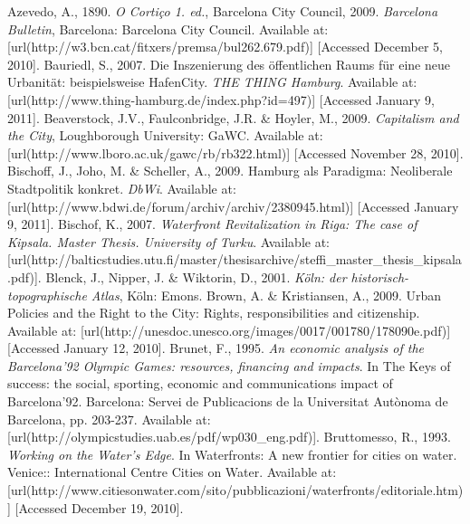 \myRefs%
{%
\startREF%
Azevedo, A., 1890. {\em O Cortiço 1. ed.}, \nl%
%
Barcelona City Council, 2009. {\em Barcelona Bulletin}, Barcelona: Barcelona City Council. Available at:  [url(http://w3.bcn.cat/fitxers/premsa/bul262.679.pdf)] [Accessed December 5, 2010]. \nl%
%
Bauriedl, S., 2007. Die Inszenierung des öffentlichen Raums für eine neue Urbanität: beispielsweise HafenCity. {\em THE THING Hamburg}. Available at:  [url(http://www.thing-hamburg.de/index.php?id=497)] [Accessed January 9, 2011]. \nl%
%
Beaverstock, J.V., Faulconbridge, J.R. \& Hoyler, M., 2009. {\em Capitalism and the City}, Loughborough University: GaWC. Available at:  [url(http://www.lboro.ac.uk/gawc/rb/rb322.html)] [Accessed November 28, 2010]. \nl%
%
Bischoff, J., Joho, M. \& Scheller, A., 2009. Hamburg als Paradigma: Neoliberale Stadtpolitik konkret. {\em DbWi}. Available at:  [url(http://www.bdwi.de/forum/archiv/archiv/2380945.html)] [Accessed January 9, 2011]. \nl%
%
Bischof, K., 2007. {\em Waterfront Revitalization in Riga: The case of Kipsala. Master Thesis. University of Turku}. Available at:  [url(http://balticstudies.utu.fi/master/thesisarchive/steffi_master_thesis_kipsala.pdf)]. \nl%
%
Blenck, J., Nipper, J. \& Wiktorin, D., 2001. {\em Köln: der historisch-topographische Atlas}, Köln: Emons. \nl%
%
Brown, A. \& Kristiansen, A., 2009. Urban Policies and the Right to the City: Rights, responsibilities and citizenship. Available at:  [url(http://unesdoc.unesco.org/images/0017/001780/178090e.pdf)] [Accessed January 12, 2010]. \nl%
%
Brunet, F., 1995. {\em An economic analysis of the Barcelona’92 Olympic Games: resources, financing and impacts}. In The Keys of success: the social, sporting, economic and communications impact of Barcelona’92.  Barcelona: Servei de Publicacions de la Universitat Autònoma de Barcelona, pp. 203-237. Available at:  [url(http://olympicstudies.uab.es/pdf/wp030_eng.pdf)]. \nl%
%
Bruttomesso, R., 1993. {\em Working on the Water's Edge}. In Waterfronts: A new frontier for cities on water.  Venice:: International Centre Cities on Water. Available at:  [url(http://www.citiesonwater.com/sito/pubblicazioni/waterfronts/editoriale.htm)] [Accessed December 19, 2010]. \nl%
}
